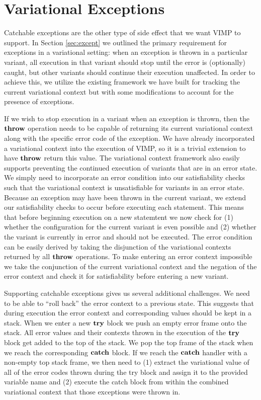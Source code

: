 \documentclass[12pt,oneside]{book}
\begin{document}
\section{Variational Exceptions}
\label{sec:varexcept}

Catchable exceptions are the other type of side effect that we want VIMP to support. In Section \ref{sec:except} we outlined the primary requirement for exceptions
in a variational setting: when an exception is thrown in a particular variant, all execution in that variant should stop until the error is (optionally) caught, but other variants
should continue their execution unaffected. In order to achieve this, we utilize the existing framework we have built for tracking the current variational context but with some
modifications to account for the presence of exceptions.

If we wish to stop execution in a variant when an exception is thrown, then the $\textbf{\textup{\textrm{throw}}}$ operation needs to be capable of returning its current variational context
along with the specific error code of the exception. We have already incorporated a variational context into the execution of VIMP, so it is a trivial extension to have $\textbf{\textup{\textrm{throw}}}$
return this value. The variational
context framework also easily supports preventing the continued execution of variants that are in an error state. We simply need to incorporate an error condition into our
satisfiability checks such that the variational context is unsatisfiable for variants in an error state. Because an exception may have been thrown in the current variant, we extend
our satisfiability checks to occur before executing each statement. This means that before beginning execution on a new statemtent we now check
for (1) whether the configuration for the current variant is even possible and (2) whether the variant is currently in error and should not be executed. The error condition can be easily derived
by taking the disjunction of the variational contexts returned by all $\textbf{\textup{\textrm{throw}}}$ operations. To make entering an error context impossible we take the conjunction of
the current variational context and the negation of the error context and check it for satisfiability before entering a new variant.

Supporting catchable exceptions gives us several additional challenges. We need to be able to ``roll back'' the error context to a previous state. This suggests that
during execution the error context and corresponding values should be kept in a stack. When we enter a new $\textbf{\textup{\textrm{try}}}$ block we push an empty error frame onto
the stack. All error values and their contexts thrown in the execution of the $\textbf{\textup{\textrm{try}}}$ block get added to the top of the stack. We pop the top frame of the stack when
we reach the corresponding $\textbf{\textup{\textrm{catch}}}$ block. If we reach the $\textbf{\textup{\textrm{catch}}}$ handler with
a non-empty top stack frame, we then need to (1) extract the variational value of all of the error codes thrown during the try block and assign it to the provided variable name and (2) execute the catch block from within the
combined variational context that those exceptions were thrown in.
\end{document}
